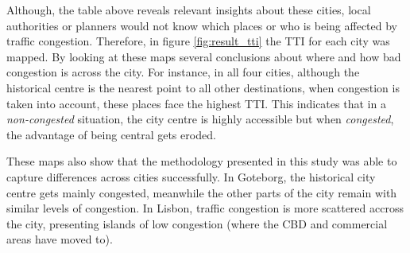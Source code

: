\documentclass[a4paper]{jpconf}
\begin{document}
\indent Although, the table above reveals relevant insights about these cities, local authorities or planners would not know which places or who is being affected by traffic congestion. Therefore, in figure \ref{fig:result_tti} the TTI for each city was mapped. By looking at these maps several conclusions about where and how bad congestion is across the city. For instance, in all four cities, although the historical centre is the nearest point to all other destinations, when congestion is taken into account, these places face the highest TTI. This indicates that in a \textit{non-congested} situation, the city centre is highly accessible but when \textit{congested}, the advantage of being central gets eroded. \par
\indent These maps also show that the methodology presented in this study 
was able to capture differences across cities successfully. In Goteborg, the historical city centre gets mainly congested, meanwhile the other parts of the city remain with similar levels of congestion. In Lisbon, traffic congestion is more scattered accross the city, presenting islands of low congestion (where the CBD and commercial areas have moved to).
\end{document}
